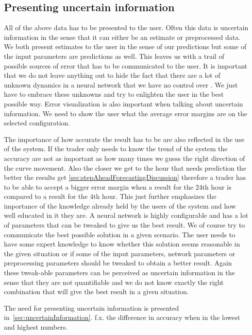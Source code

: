 \subsection{Presenting uncertain information}
All of the above data has to be presented to the user. Often this data is uncertain information in the sense that it can either be an estimate or preprocessed data. We both present estimates to the user in the sense of our predictions but some of the input parameters are predictions as well. This leaves us with a trail of possible sources of error that has to be communicated to the user. It is important that we do not leave anything out to hide the fact that there are a lot of unknown dynamics in a neural network that we have no control over \cite{young2010using}. We just have to embrace these unknowns and try to enlighten the user in the best possible way. Error visualization is also important when talking about uncertain information. We need to show the user what the average error margins are on the selected configuration.

The importance of how accurate the result has to be are also reflected in the use of the system. If the trader only needs to know the trend of the system the accuracy are not as important as how many times we guess the right direction of the curve movement. Also the closer we get to the hour that needs prediction the better the results get \ref{sec:stepAheadForecastingDiscussion} therefore a trader has to be able to accept a bigger error margin when a result for the 24th hour is compared to a result for the 4th hour. This just further emphasizes the importance of the knowledge already held by the users of the system and how well educated in it they are. A neural network is highly configurable and has a lot of parameters that can be tweaked to give us the best result. We of course try to communicate the best possible solution in a given scenario. The user needs to have some expert knowledge to know whether this solution seems reasonable in the given situation or if some of the input parameters, network parameters or preprocessing parameters should be tweaked to obtain a better result. Again these tweak-able parameters can be perceived as uncertain information \cite{UncertainInformation} in the sense that they are not quantifiable and we do not know exactly the right combination that will give the best result in a given situation. 

The need for presenting uncertain information is presented in~\ref{sec:uncertainInformation}.
f.x. the difference in accuracy when in the lowest and highest numbers.

